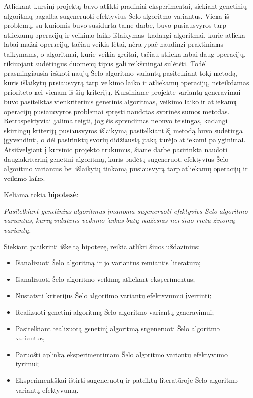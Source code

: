 \documentclass{VUMIFInfBakalaurinis}
\begin{document}
Atliekant kursinį projektą buvo atlikti pradiniai eksperimentai, siekiant genetinių algoritmų pagalba sugeneruoti efektyvius Šelo algoritmo variantus.
Viena iš problemų, su kuriomis buvo susidurta tame darbe, buvo pusiausvyros tarp atliekamų operacijų ir veikimo laiko išlaikymas, kadangi
algoritmai, kurie atlieka labai mažai operacijų, tačiau veikia lėtai, nėra ypač naudingi praktiniams taikymams, o  
algoritmai, kurie veikia greitai, tačiau atlieka labai daug operacijų, rikiuojant sudėtingus duomenų tipus gali reikšmingai sulėtėti.
Todėl prasmingiausia ieškoti naujų Šelo algoritmo variantų pasitelkiant tokį metodą, kuris išlaikytų pusiausvyrą tarp veikimo laiko ir atliekamų operacijų,
neteikdamas prioriteto nei vienam iš šių kriterijų.
Kursiniame projekte variantų generavimui buvo pasitelktas vienkriterinis genetinis algoritmas, veikimo laiko ir atliekamų operacijų pusiausvyros problemai spręsti
naudotas svorinės sumos metodas.
Retrospektyviai galima teigti, jog šis sprendimas nebuvo teisingas, kadangi skirtingų kriterijų pusiausvyros išlaikymą
pasitelkiant šį metodą buvo sudėtinga įgyvendinti, o dėl pasirinktų svorių didžiausią įtaką turėjo atliekami palyginimai.
Atsižvelgiant į kursinio projekto trūkumus, šiame darbe pasirinkta naudoti daugiakriterinį genetinį algoritmą, kuris
padėtų sugeneruoti efektyvius Šelo algoritmo variantus bei išlaikytų tinkamą pusiausvyrą tarp atliekamų operacijų ir veikimo laiko.

\pagebreak

Keliama tokia \textbf{hipotezė}:

\textit{Pasitelkiant genetinius algoritmus įmanoma sugeneruoti efektyvius Šelo algoritmo variantus,
kurių vidutinis veikimo laikas būtų mažesnis nei šiuo metu žinomų variantų.}

\medskip

Siekiant patikrinti iškeltą hipotezę, reikia atlikti šiuos uždavinius:
\begin{itemize}
    \item Išanalizuoti Šelo algoritmą ir jo variantus remiantis literatūra;
    \item Išanalizuoti Šelo algoritmo veikimą atliekant eksperimentus;
    \item Nustatyti kriterijus Šelo algoritmo variantų efektyvumui įvertinti;
    \item Realizuoti genetinį algoritmą Šelo algoritmo variantų generavimui;
    \item Pasitelkiant realizuotą genetinį algoritmą sugeneruoti Šelo algoritmo variantus;
    \item Paruošti aplinką eksperimentiniam Šelo algoritmo variantų efektyvumo tyrimui;
    \item Eksperimentiškai ištirti sugeneruotų ir pateiktų literatūroje Šelo algoritmo variantų efektyvumą.
  \end{itemize}
\end{document}
